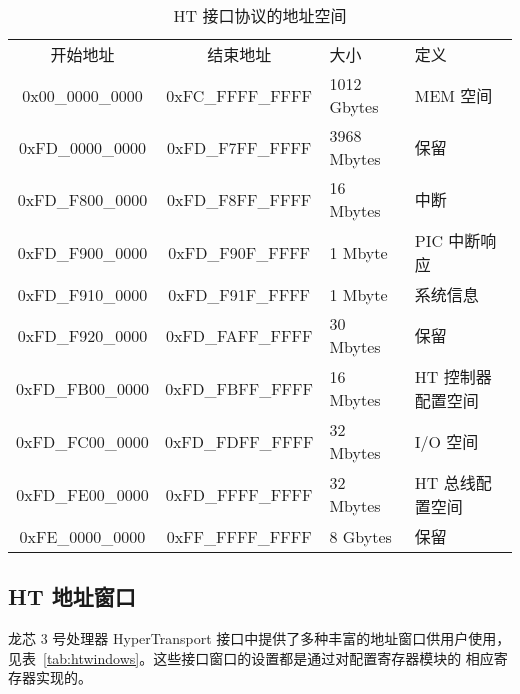 \begin{table}[htbp]
  \centering
  \begin{tabular}{|c|c|l|l|} \hline
    开始地址         & 结束地址         & 大小        & 定义 \\ \hhline
    0x00\_0000\_0000 & 0xFC\_FFFF\_FFFF & 1012 Gbytes & MEM 空间 \\
    0xFD\_0000\_0000 & 0xFD\_F7FF\_FFFF & 3968 Mbytes & 保留 \\
    0xFD\_F800\_0000 & 0xFD\_F8FF\_FFFF & 16 Mbytes   & 中断 \\
    0xFD\_F900\_0000 & 0xFD\_F90F\_FFFF & 1 Mbyte     & PIC 中断响应 \\
    0xFD\_F910\_0000 & 0xFD\_F91F\_FFFF & 1 Mbyte     & 系统信息 \\
    0xFD\_F920\_0000 & 0xFD\_FAFF\_FFFF & 30 Mbytes   & 保留 \\
    0xFD\_FB00\_0000 & 0xFD\_FBFF\_FFFF & 16 Mbytes   & HT 控制器配置空间 \\
    0xFD\_FC00\_0000 & 0xFD\_FDFF\_FFFF & 32 Mbytes   & I/O 空间 \\
    0xFD\_FE00\_0000 & 0xFD\_FFFF\_FFFF & 32 Mbytes   & HT 总线配置空间 \\
    0xFE\_0000\_0000 & 0xFF\_FFFF\_FFFF & 8 Gbytes    & 保留 \\ \hline
  \end{tabular}
  \caption{HT 接口协议的地址空间}
  \label{tab:htaddrspace}
\end{table}

\subsection{HT 地址窗口}

龙芯 3 号处理器 HyperTransport 接口中提供了多种丰富的地址窗口供用户使用，
见表~\ref{tab:htwindows}。这些接口窗口的设置都是通过对配置寄存器模块的
相应寄存器实现的。

